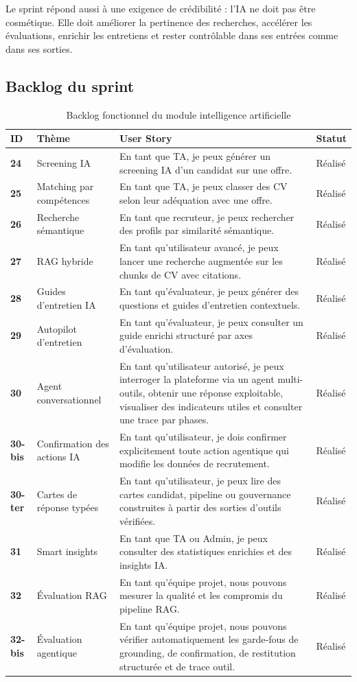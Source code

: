 Le sprint répond aussi à une exigence de crédibilité : l'IA ne doit pas être cosmétique. Elle doit améliorer la pertinence des recherches, accélérer les évaluations, enrichir les entretiens et rester contrôlable dans ses entrées comme dans ses sorties.

\subsection{Backlog du sprint}
\begin{table}[H]
  \centering
  \caption{Backlog fonctionnel du module intelligence artificielle}
  \begin{tabularx}{\textwidth}{>{\bfseries}p{1.3cm}p{3.2cm}X>{\raggedright\arraybackslash}p{2cm}}
    \toprule
    ID & Thème & User Story & Statut \\
    \midrule
    24 & Screening IA & En tant que TA, je peux générer un screening IA d'un candidat sur une offre. & Réalisé \\
    25 & Matching par compétences & En tant que TA, je peux classer des CV selon leur adéquation avec une offre. & Réalisé \\
    26 & Recherche sémantique & En tant que recruteur, je peux rechercher des profils par similarité sémantique. & Réalisé \\
    27 & RAG hybride & En tant qu'utilisateur avancé, je peux lancer une recherche augmentée sur les chunks de CV avec citations. & Réalisé \\
    28 & Guides d'entretien IA & En tant qu'évaluateur, je peux générer des questions et guides d'entretien contextuels. & Réalisé \\
    29 & Autopilot d'entretien & En tant qu'évaluateur, je peux consulter un guide enrichi structuré par axes d'évaluation. & Réalisé \\
    30 & Agent conversationnel & En tant qu'utilisateur autorisé, je peux interroger la plateforme via un agent multi-outils, obtenir une réponse exploitable, visualiser des indicateurs utiles et consulter une trace par phases. & Réalisé \\
    30-bis & Confirmation des actions IA & En tant qu'utilisateur, je dois confirmer explicitement toute action agentique qui modifie les données de recrutement. & Réalisé \\
    30-ter & Cartes de réponse typées & En tant qu'utilisateur, je peux lire des cartes candidat, pipeline ou gouvernance construites à partir des sorties d'outils vérifiées. & Réalisé \\
    31 & Smart insights & En tant que TA ou Admin, je peux consulter des statistiques enrichies et des insights IA. & Réalisé \\
    32 & Évaluation RAG & En tant qu'équipe projet, nous pouvons mesurer la qualité et les compromis du pipeline RAG. & Réalisé \\
    32-bis & Évaluation agentique & En tant qu'équipe projet, nous pouvons vérifier automatiquement les garde-fous de grounding, de confirmation, de restitution structurée et de trace outil. & Réalisé \\
    \bottomrule
  \end{tabularx}
\end{table}

